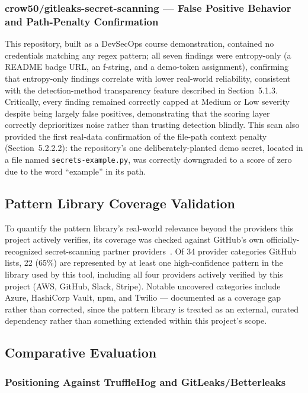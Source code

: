 \documentclass[12pt]{article}
\begin{document}
\subsubsection{crow50/gitleaks-secret-scanning --- False Positive Behavior and Path-Penalty Confirmation}

This repository, built as a DevSecOps course demonstration, contained no credentials matching any regex pattern; all seven findings were entropy-only (a README badge URL, an f-string, and a demo-token assignment), confirming that entropy-only findings correlate with lower real-world reliability, consistent with the detection-method transparency feature described in Section~5.1.3. Critically, every finding remained correctly capped at Medium or Low severity despite being largely false positives, demonstrating that the scoring layer correctly deprioritizes noise rather than trusting detection blindly. This scan also provided the first real-data confirmation of the file-path context penalty (Section~5.2.2.2): the repository's one deliberately-planted demo secret, located in a file named \texttt{secrets-example.py}, was correctly downgraded to a score of zero due to the word ``example'' in its path.

\subsection{Pattern Library Coverage Validation}

To quantify the pattern library's real-world relevance beyond the providers this project actively verifies, its coverage was checked against GitHub's own officially-recognized secret-scanning partner providers~\cite{githubpartners}. Of 34 provider categories GitHub lists, 22 (65\%) are represented by at least one high-confidence pattern in the library used by this tool, including all four providers actively verified by this project (AWS, GitHub, Slack, Stripe). Notable uncovered categories include Azure, HashiCorp Vault, npm, and Twilio --- documented as a coverage gap rather than corrected, since the pattern library is treated as an external, curated dependency rather than something extended within this project's scope.

\subsection{Comparative Evaluation}

\subsubsection{Positioning Against TruffleHog and GitLeaks/Betterleaks}
\end{document}
